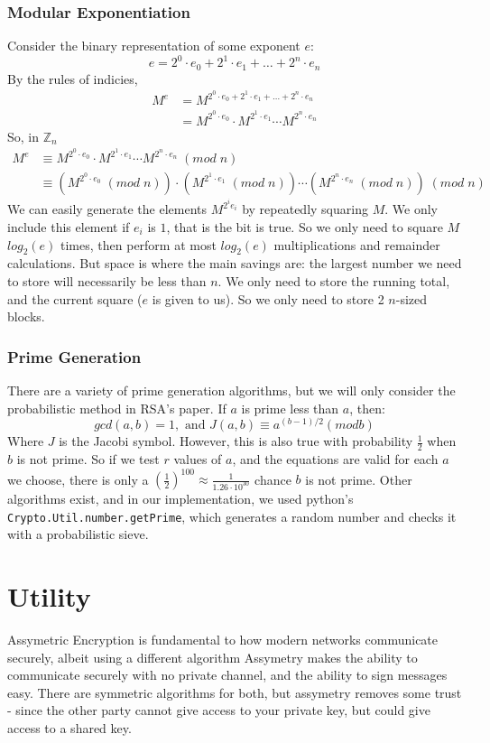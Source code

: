 \documentclass{article}
\begin{document}
\subsubsection{Modular Exponentiation}
Consider the binary representation of some exponent $e$:
\[ e = 2^0 \cdot e_0 + 2^1 \cdot e_1 + \ldots + 2^n \cdot e_n \]
By the rules of indicies,
\begin{align*}
    M^e & = M^{2^0 \cdot e_0 + 2^1 \cdot e_1 + \ldots + 2^n \cdot e_n}          \\
        & = M^{2^0 \cdot e_0} \cdot M^{ 2^1 \cdot e_1} \cdots M^{2^n \cdot e_n}
\end{align*}
So, in $\mathbb{Z}_n$
\begin{align*}
    M^e & \equiv M^{2^0 \cdot e_0} \cdot M^{ 2^1 \cdot e_1} \cdots M^{2^n \cdot e_n} \; (mod \; n)                                                  \\
        & \equiv ( M^{2^0 \cdot e_0} \; (mod \; n)) \cdot  (M^{ 2^1 \cdot e_1} \; (mod \; n)) \cdots (M^{2^n \cdot e_n} \; (mod \; n))\; (mod \; n)
\end{align*}
We can easily generate the elements $M^{2^i e_i}$ by repeatedly squaring $M$.
We only include this element if $e_i$ is $1$, that is the bit is true.
So we only need to square $M$ $log_2(e)$ times,
then perform at most $log_2(e)$ multiplications and remainder calculations.
But space is where the main savings are:
the largest number we need to store will necessarily be less than $n$.
We only need to store the running total, and the current square ($e$ is given to us).
So we only need to store 2 $n$-sized blocks.
\subsubsection{Prime Generation}
There are a variety of prime generation algorithms,
but we will only consider the probabilistic method in RSA's paper.
If $a$ is prime less than $a$, then:
\[
    gcd(a,b) = 1, \text{ and } J(a, b) \equiv a^{(b-1)/2} (mod b)
\]
Where $J$ is the Jacobi symbol.
However, this is also true with probability $\frac{1}{2}$ when $b$ is not prime.
So if we test $r$ values of $a$, and the equations are valid for each $a$ we choose,
there is only a $(\frac{1}{2})^{100} \approx \frac{1}{1.26 \cdot 10^{30}}$ chance $b$ is not prime.
Other algorithms exist, and in our implementation, we used python's \texttt{Crypto.Util.number.getPrime},
which generates a random number and checks it with a probabilistic sieve.

\section{Utility}
Assymetric Encryption is fundamental to how modern networks communicate securely,
albeit using a different algorithm
Assymetry makes the ability to communicate securely with no private channel,
and the ability to sign messages easy.
There are symmetric algorithms for both, but assymetry removes some trust
- since the other party cannot give access to your private key, but could
give access to a shared key.
\end{document}
